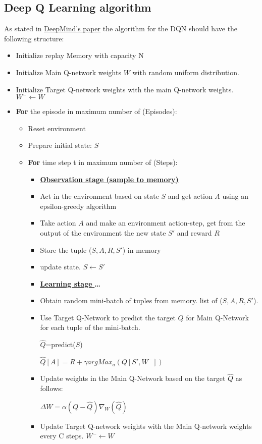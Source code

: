 \subsection{Deep Q Learning algorithm}
As stated in \href{https://storage.googleapis.com/deepmind-media/dqn/DQNNaturePaper.pdf}{DeepMind's paper} the algorithm for the DQN should have the following structure:
\begin{itemize}
\item Initialize replay Memory with capacity N
\item Initialize Main Q-network weights $W$ with random uniform distribution.
\item Initialize Target Q-network weights with the main Q-network weights. $W^-\leftarrow W$
\item \textbf{For} the episode in maximum number of (Episodes):
\begin{itemize}
\item Reset environment
\item Prepare initial state: $S$
\item \textbf{For} time step t in maximum number of (Steps):
\begin{itemize}
\item[] \underline{\textbf{Observation stage (sample to memory)}}
\item Act in the environment based on state $S$ and get action $A$ using an epsilon-greedy algorithm
\item Take action $A$ and make an environment action-step, get from the output of the environment the new state $S'$ and reward $R$
\item Store the tuple ($S,A,R,S'$) in memory
\item update state. $S \leftarrow S'$
\item[] \underline{\textbf{Learning stage }}\textbf{\dots} 
\item Obtain random mini-batch of tuples from memory. list of ($S,A,R,S'$).
\item Use Target Q-Network to predict the target $Q$ for Main Q-Network for each tuple of the mini-batch. 

$\hat{Q}$=predict($S$)

$\hat{Q}[A]=R+\gamma argMax_a(Q[S',W^-])$
\item Update weights in the Main Q-Network based on the target $\hat{Q}$ as follows: 

$\Delta W=\alpha (Q-\hat{Q}) \nabla_W(\hat{Q})$
\item Update Target Q-network weights with the Main Q-network weights every C steps. $W^-\leftarrow W$
\end{itemize}
\end{itemize}
\end{itemize}